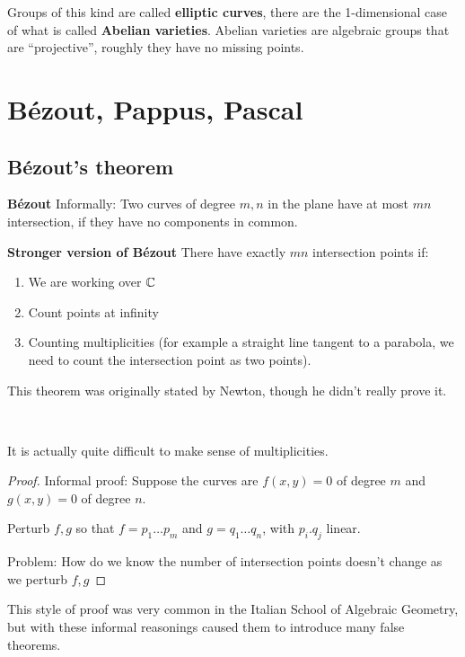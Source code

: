 \begin{enumerate}
\begin{definition}
    Groups of this kind are called \textbf{elliptic curves}, there are the 1-dimensional case of what is called \textbf{Abelian varieties}. 
    Abelian varieties are algebraic groups that are ``projective'', roughly they have no missing points.
\end{definition} 

\end{enumerate}

\section{Bézout, Pappus, Pascal}
\subsection{Bézout's theorem}
\begin{theorem} \textbf{Bézout}
    Informally: Two curves of degree $m,n$ in the plane have at most $mn$ intersection, if they have no components in common.    

    \textbf{Stronger version of Bézout}
    There have exactly $mn$ intersection points if:\begin{enumerate}
        \item We are working over $\mathbb{C}$
        \item Count points at infinity
        \item Counting multiplicities (for example a straight line tangent to a parabola, we need to count the intersection point as two points).
    \end{enumerate}
\end{theorem}
This theorem was originally stated by Newton, though he didn't really prove it.

\

It is actually quite difficult to make sense of multiplicities.

\begin{proof}
    Informal proof: Suppose the curves are $f(x,y) = 0$ of degree $m$ and $g(x,y) = 0$ of degree $n$.

    Perturb $f,g$ so that $f = p_1\dots p_m$ and $g = q_1\dots q_n$, with $p_i.q_j$ linear.

    Problem: How do we know the number of intersection points doesn't change as we perturb $f,g$
\end{proof}

This style of proof was very common in the Italian School of Algebraic Geometry, but with these informal reasonings caused them to introduce many false theorems.

